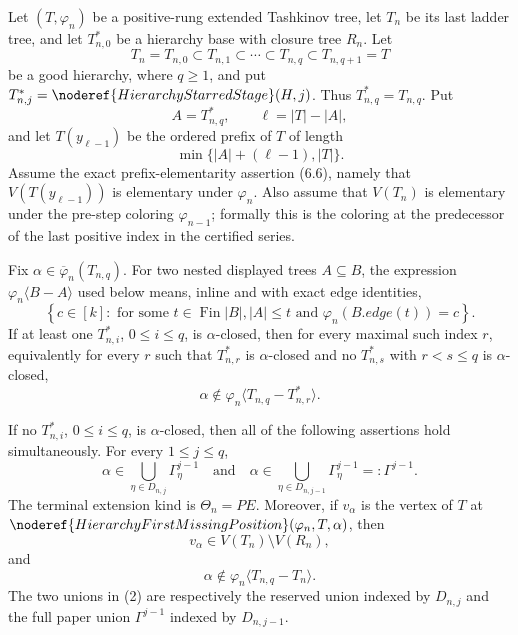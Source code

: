 \begin{lemma}
Let $(T,\varphi_n)$ be a positive-rung extended Tashkinov tree, let
$T_n$ be its last ladder tree, and let $T_{n,0}^{*}$ be a hierarchy
base with closure tree $R_n$.  Let
\[
 T_n=T_{n,0}\subset T_{n,1}\subset\cdots\subset
 T_{n,q}\subset T_{n,q+1}=T
\]
be a good hierarchy, where $q\geq1$, and put
$T_{n,j}^{*}=\noderef{HierarchyStarredStage}(H,j)$.  Thus
$T_{n,q}^{*}=T_{n,q}$.  Put
\[
 A=T_{n,q}^{*},\qquad \ell=|T|-|A|,
\]
and let $T(y_{\ell-1})$ be the ordered prefix of $T$ of length
\[
 \min\{|A|+(\ell-1),|T|\}.
\]
Assume the exact prefix-elementarity assertion (6.6), namely that
$V(T(y_{\ell-1}))$ is elementary under $\varphi_n$.  Also assume that
$V(T_n)$ is elementary under the pre-step coloring
$\varphi_{n-1}$; formally this is the coloring at the predecessor of
the last positive index in the certified series.

Fix $\alpha\in\overline\varphi_n(T_{n,q})$.  For two nested displayed
trees $A\subseteq B$, the expression
$\varphi_n\langle B-A\rangle$ used below means, inline and with exact
edge identities,
\[
 \left\{c\in[k]:\text{ for some }t\in\operatorname{Fin}|B|,
       |A|\leq t\text{ and }\varphi_n(B.\mathit{edge}(t))=c\right\}.
                                                               \tag{*}
\]
If at least one $T_{n,i}^{*}$, $0\leq i\leq q$, is
$\alpha$-closed, then for every maximal such index $r$, equivalently
for every $r$ such that $T_{n,r}^{*}$ is $\alpha$-closed and no
$T_{n,s}^{*}$ with $r<s\leq q$ is $\alpha$-closed,
\[
       \alpha\notin
       \varphi_n\langle T_{n,q}-T_{n,r}^{*}\rangle.            \tag{1}
\]

If no $T_{n,i}^{*}$, $0\leq i\leq q$, is $\alpha$-closed, then all
of the following assertions hold simultaneously.  For every
$1\leq j\leq q$,
\[
 \alpha\in
   \bigcup_{\eta\in D_{n,j}}\Gamma^{j-1}_{\eta}
 \quad\text{and}\quad
 \alpha\in
   \bigcup_{\eta\in D_{n,j-1}}\Gamma^{j-1}_{\eta}
   =:\Gamma^{j-1}.                                             \tag{2}
\]
The terminal extension kind is $\Theta_n=PE$.  Moreover, if
$v_\alpha$ is the vertex of $T$ at
$\noderef{HierarchyFirstMissingPosition}(\varphi_n,T,\alpha)$, then
\[
                  v_\alpha\in V(T_n)\setminus V(R_n),          \tag{3}
\]
and
\[
       \alpha\notin
       \varphi_n\langle T_{n,q}-T_n\rangle.                    \tag{4}
\]
The two unions in (2) are respectively the reserved union indexed by
$D_{n,j}$ and the full paper union $\Gamma^{j-1}$ indexed by
$D_{n,j-1}$.
\end{lemma}
